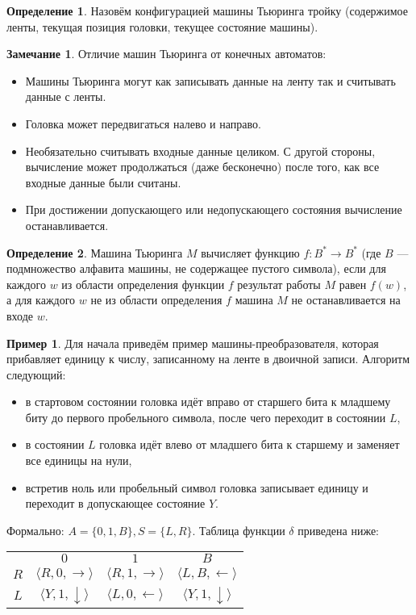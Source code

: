 \documentclass[10pt,twoside]{article}
\theoremstyle{plain}
\theoremstyle{definition}
\newtheorem{defi}{Определение}
\newtheorem*{remark}{Замечание}
\newtheorem*{example}{Пример}
\begin{document}
\begin{defi}
  Назовём конфигурацией машины Тьюринга тройку (содержимое ленты, текущая позиция головки, текущее состояние машины).
\end{defi}

\begin{remark} Отличие машин Тьюринга от конечных автоматов:
  \begin{itemize}
    \item Машины Тьюринга могут как записывать данные на ленту так и считывать данные с ленты.
    \item Головка может передвигаться налево и направо.
    \item Необязательно считывать входные данные целиком. С другой стороны, вычисление может продолжаться (даже бесконечно) после того, как все входные данные были считаны.
    \item При достижении допускающего или недопускающего состояния вычисление останавливается.
  \end{itemize}
\end{remark}

\begin{defi}
Машина Тьюринга $M$ вычисляет функцию $f : B^* \to B^*$ (где $B$ — подмножество алфавита машины, не содержащее пустого символа), если для каждого $w$ из области определения функции $f$ результат работы $M$ равен $f(w)$, а для каждого $w$ не из области определения $f$ машина $M$ не останавливается на входе $w$.
\end{defi}

\begin{example}
Для начала приведём пример машины-преобразователя, которая прибавляет единицу к числу, записанному на ленте в двоичной записи. Алгоритм следующий:
\begin{itemize}
  \item в стартовом состоянии головка идёт вправо от старшего бита к младшему биту до первого пробельного символа, после чего переходит в состоянии $L$,
  \item в состоянии $L$ головка идёт влево от младшего бита к старшему и заменяет все единицы на нули,
  \item встретив ноль или пробельный символ головка записывает единицу и переходит в допускающее состояние $Y$.
\end{itemize}
Формально: $A = \{0, 1, B \}, S = \{L, R\}$. Таблица функции $\delta$ приведена ниже:\\
\begin{center}
\begin{tabular}{cccc}
& $0$ & $1$ & $B$\\
$R$ & $\langle R, 0, \rightarrow \rangle $ & $\langle R, 1, \rightarrow \rangle$ & $\langle L, B, \leftarrow \rangle$\\
$L$ & $\langle Y, 1, \downarrow \rangle$ & $\langle L, 0, \leftarrow \rangle$ & $\langle Y, 1, \downarrow \rangle$\\
\end{tabular}
\end{center}
\end{example}
\end{document}
